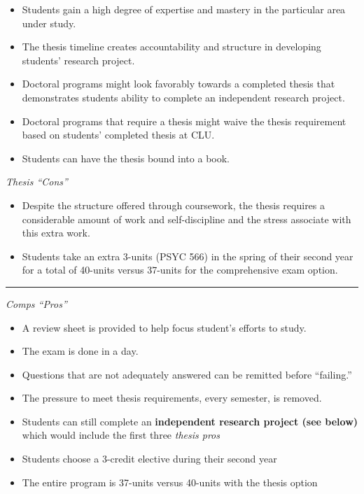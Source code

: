 \documentclass[openany]{book}
\providecommand{\tightlist}{%
  \setlength{\itemsep}{0pt}\setlength{\parskip}{0pt}}
\begin{document}
\begin{itemize}
\tightlist
\item
  Students gain a high degree of expertise and mastery in the particular area under study.
\item
  The thesis timeline creates accountability and structure in developing students' research project.
\item
  Doctoral programs might look favorably towards a completed thesis that demonstrates students ability to complete an independent research project.
\item
  Doctoral programs that require a thesis might waive the thesis requirement based on students' completed thesis at CLU.
\item
  Students can have the thesis bound into a book.
\end{itemize}

\emph{Thesis ``Cons''}

\begin{itemize}
\tightlist
\item
  Despite the structure offered through coursework, the thesis requires a considerable amount of work and self-discipline and the stress associate with this extra work.
\item
  Students take an extra 3-units (PSYC 566) in the spring of their second year for a total of 40-units versus 37-units for the comprehensive exam option.
\end{itemize}

\begin{center}\rule{0.5\linewidth}{0.5pt}\end{center}

\emph{Comps ``Pros''}

\begin{itemize}
\tightlist
\item
  A review sheet is provided to help focus student's efforts to study.
\item
  The exam is done in a day.
\item
  Questions that are not adequately answered can be remitted before ``failing.''
\item
  The pressure to meet thesis requirements, every semester, is removed.
\item
  Students can still complete an \textbf{independent research project (see below)} which would include the first three \emph{thesis pros}
\item
  Students choose a 3-credit elective during their second year
\item
  The entire program is 37-units versus 40-units with the thesis option
\end{itemize}
\end{document}
